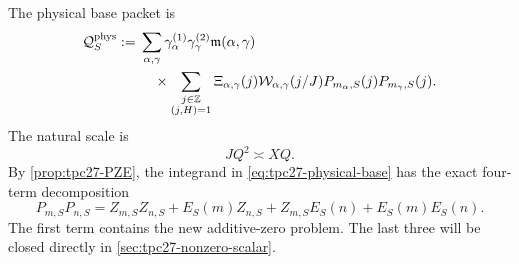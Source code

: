 The physical base packet is
\begin{align}
 \mathcal Q_S^{\rm phys}
 :={}&\sum_{\alpha,\gamma}
 \gamma_\alpha^{(1)}\gamma_\gamma^{(2)}
 \mathfrak m(\alpha,\gamma)
 \notag\\
 &\quad\times
 \sum_{\substack{j\in\mathbb Z\\(j,H)=1}}
 \Xi_{\alpha,\gamma}(j)
 \mathcal W_{\alpha,\gamma}(j/J)
 P_{m_\alpha,S}(j)P_{m_\gamma,S}(j).
 \label{eq:tpc27-physical-base}
\end{align}
The natural scale is
\begin{equation}
 JQ^2\asymp XQ.
 \label{eq:tpc27-natural-scale}
\end{equation}
By \cref{prop:tpc27-PZE}, the integrand in
\eqref{eq:tpc27-physical-base} has the exact four-term decomposition
\begin{equation}
 P_{m,S}P_{n,S}
 =Z_{m,S}Z_{n,S}
 +E_S(m)Z_{n,S}
 +Z_{m,S}E_S(n)
 +E_S(m)E_S(n).
 \label{eq:tpc27-ZZ-EZ-ZE-EE}
\end{equation}
The first term contains the new additive-zero problem.  The last three
will be closed directly in \cref{sec:tpc27-nonzero-scalar}.
